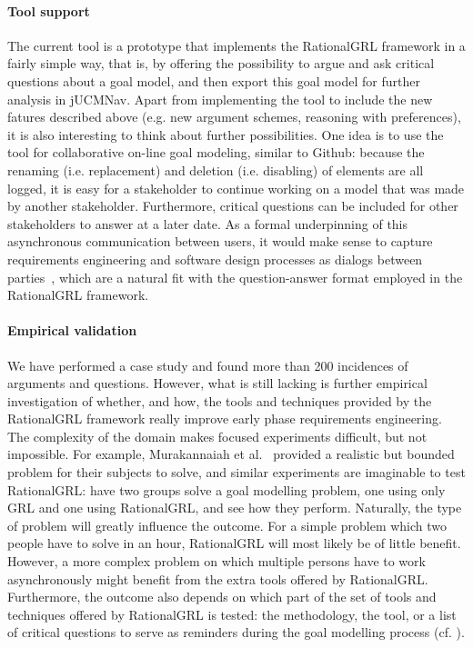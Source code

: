 \paragraph{Tool support}
The current tool is a prototype that implements the RationalGRL framework in a fairly simple way, that is, by offering the possibility to argue and ask critical questions about a goal model, and then export this goal model for further analysis in jUCMNav. Apart from implementing the tool to include the new fatures described above (e.g. new argument schemes, reasoning with preferences), it is also interesting to think about further possibilities. One idea is to use the tool for collaborative on-line goal modeling, similar to Github: because the renaming (i.e. replacement) and deletion (i.e. disabling) of elements are all logged, it is easy for a stakeholder to continue working on a model that was made by another stakeholder. Furthermore, critical questions can be included for other stakeholders to answer at a later date. As a formal underpinning of this asynchronous communication between users, it would make sense to capture requirements engineering and software design processes as dialogs between parties~\cite{finkelstein1989multiparty,BlackEtal2013}, which are a natural fit with the question-answer format employed in the RationalGRL framework. 

\paragraph{Empirical validation}
We have performed a case study and found more than 200 incidences of arguments and questions. However, what is still lacking is further empirical investigation of whether, and how, the tools and techniques provided by the RationalGRL framework really improve early phase requirements engineering. The complexity of the domain makes focused experiments difficult, but not impossible. For example, Murakannaiah et al.~\cite{murukannaiah2015} provided a realistic but bounded problem for their subjects to solve, and similar experiments are imaginable to test RationalGRL: have two groups solve a goal modelling problem, one using only GRL and one using RationalGRL, and see how they perform. Naturally, the type of problem will greatly influence the outcome. For a simple problem which two people have to solve in an hour, RationalGRL will most likely be of little benefit. However, a more complex problem on which multiple persons have to work asynchronously might benefit from the extra tools offered by RationalGRL. Furthermore, the outcome also depends on which part of the set of tools and techniques offered by RationalGRL is tested: the methodology, the tool, or a list of critical questions to serve as reminders during the goal modelling process (cf. \cite{SchriekEtal2016}).

